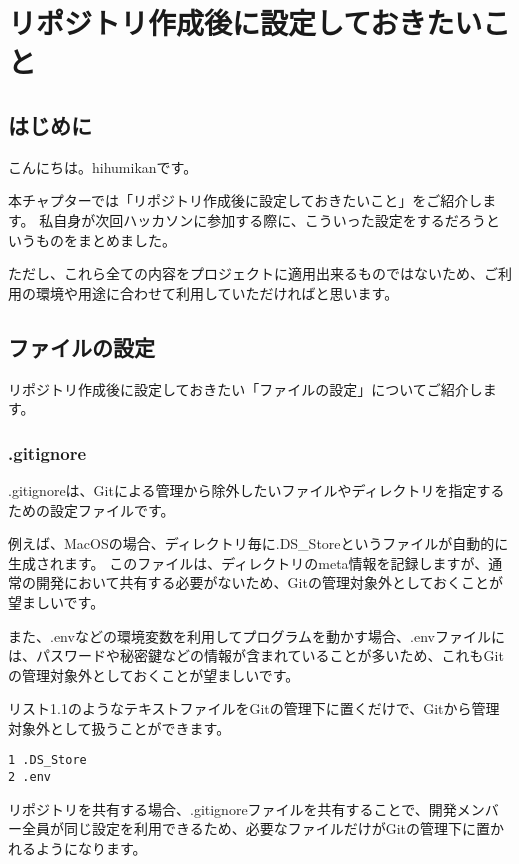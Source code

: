 \chapter{リポジトリ作成後に設定しておきたいこと}
\section{はじめに}
こんにちは。hihumikanです。

本チャプターでは「リポジトリ作成後に設定しておきたいこと」をご紹介します。
私自身が次回ハッカソンに参加する際に、こういった設定をするだろうというものをまとめました。

ただし、これら全ての内容をプロジェクトに適用出来るものではないため、ご利用の環境や用途に合わせて利用していただければと思います。

\section{ファイルの設定}
リポジトリ作成後に設定しておきたい「ファイルの設定」についてご紹介します。

\subsection{.gitignore}
.gitignoreは、Gitによる管理から除外したいファイルやディレクトリを指定するための設定ファイルです。

例えば、MacOSの場合、ディレクトリ毎に.DS\_Storeというファイルが自動的に生成されます。
このファイルは、ディレクトリのmeta情報を記録しますが、通常の開発において共有する必要がないため、Gitの管理対象外としておくことが望ましいです。

また、.envなどの環境変数を利用してプログラムを動かす場合、.envファイルには、パスワードや秘密鍵などの情報が含まれていることが多いため、これもGitの管理対象外としておくことが望ましいです。

リスト1.1のようなテキストファイルをGitの管理下に置くだけで、Gitから管理対象外として扱うことができます。

\begin{tcolorbox}[title=リスト1.1 .gitignore]
  \begin{verbatim}
1 .DS_Store
2 .env
\end{verbatim}
\end{tcolorbox}

リポジトリを共有する場合、.gitignoreファイルを共有することで、開発メンバー全員が同じ設定を利用できるため、必要なファイルだけがGitの管理下に置かれるようになります。

